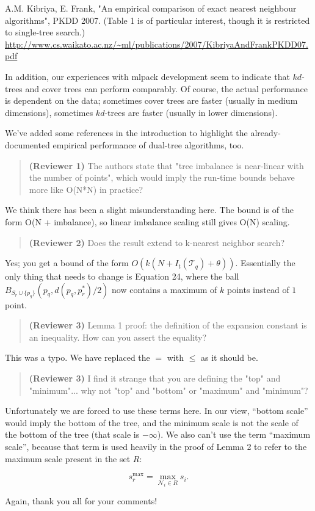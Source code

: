 \documentclass[10pt]{article} %
\begin{document}
A.M. Kibriya, E. Frank, "An empirical comparison of exact nearest neighbour
algorithms", PKDD 2007.  (Table 1 is of particular interest, though it is
restricted to single-tree search.)
\url{http://www.cs.waikato.ac.nz/~ml/publications/2007/KibriyaAndFrankPKDD07.pdf}

In addition, our experiences with mlpack development seem to indicate that
$kd$-trees and cover trees can perform comparably.  Of course, the actual
performance is dependent on the data; sometimes cover trees are faster (usually
in medium dimensions), sometimes $kd$-trees are faster (usually in lower
dimensions).

We've added some references in the introduction to highlight the
already-documented empirical performance of dual-tree algorithms, too.

\begin{quote}
{\bf (Reviewer 1)} The authors state that "tree imbalance is near-linear with
the number of points", which would imply the run-time bounds behave more like
O(N*N) in practice?
\end{quote}

We think there has been a slight misunderstanding here.  The bound is of the
form O(N + imbalance), so linear imbalance scaling still gives O(N) scaling.

\begin{quote}
{\bf (Reviewer 2)} Does the result extend to k-nearest neighbor search?
\end{quote}

Yes; you get a bound of the form $O(k(N + I_t(\mathscr{T}_q) + \theta))$.
Essentially the only thing that needs to change is Equation 24, where the ball
$B_{S_r \cup \{ p_q \}}(p_q, d(p_q, p_r^*) / 2)$ now contains a maximum of $k$
points instead of $1$ point.

\begin{quote}
{\bf (Reviewer 3)} Lemma 1 proof: the definition of the expansion constant is an
inequality.  How can you assert the equality?
\end{quote}

This was a typo.  We have replaced the $=$ with $\le$ as it should be.

\begin{quote}
{\bf (Reviewer 3)} I find it strange that you are defining the "top" and
"minimum"... why not "top" and "bottom" or "maximum" and "minimum"?
\end{quote}

Unfortunately we are forced to use these terms here.  In our view, ``bottom
scale'' would imply the bottom of the tree, and the minimum scale is not the
scale of the bottom of the tree (that scale is $-\infty$).  We also can't use
the term ``maximum scale'', because that term is used heavily in the proof of
Lemma 2 to refer to the maximum scale present in the set $R$:

$$s_r^{\max} = \max_{\mathscr{N}_i \in R} s_i.$$

Again, thank you all for your comments!
\end{document}
